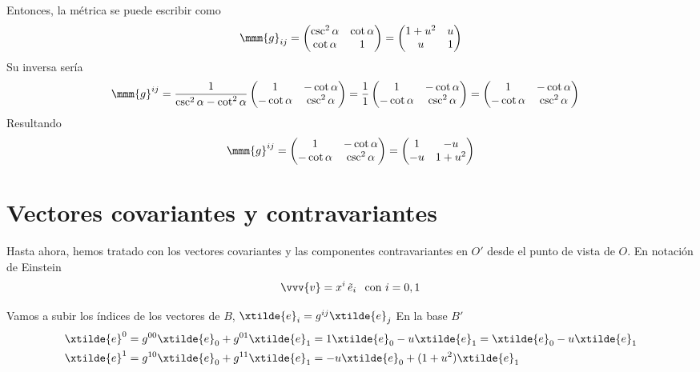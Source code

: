 Entonces, la métrica se puede escribir como
\begin{equation}
  \mmm{g}_{ij}
  = \begin{pmatrix}
    \csc^2\alpha & \cot\alpha\\
    \cot\alpha & 1      
  \end{pmatrix}
  = \begin{pmatrix}
    1+u^2 & u\\
    u & 1      
  \end{pmatrix}
\end{equation}
Su inversa sería
{\small
  \begin{align*}
    \mmm{g}^{ij}
    &=
      \dfrac{1}{\csc^2\alpha-\cot^2\alpha}
      \begin{pmatrix}
        1 & -\cot\alpha\\
        -\cot\alpha & \csc^2\alpha      
      \end{pmatrix}
      = \dfrac{1}{1}
      \begin{pmatrix}
        1 & -\cot\alpha\\
        -\cot\alpha & \csc^2\alpha
      \end{pmatrix}
      = \begin{pmatrix}
        1 & -\cot\alpha\\
        -\cot\alpha & \csc^2\alpha
      \end{pmatrix}    
  \end{align*}
}
Resultando
\begin{equation}
  \mmm{g}^{ij}
    = \begin{pmatrix}
      1 & -\cot\alpha\\
      -\cot\alpha & \csc^2\alpha
    \end{pmatrix}
    = \begin{pmatrix}
      1 & -u\\
      -u & 1+u^2
    \end{pmatrix}
\end{equation}

\section{Vectores covariantes y contravariantes}
Hasta ahora, hemos tratado con los vectores covariantes y las componentes contravariantes
en $O'$ desde el punto de vista de $O$.
En notación de Einstein
\[
  \vvv{v} = x^i\,\tilde{e}_i
  \hspace{0.75em}\text{con } i = 0, 1
\]

Vamos a subir los índices de los vectores de $B$, $\xtilde{e}_i = g^{ij}\xtilde{e}_j$
En la base $B'$
\begin{align*}
  \xtilde{e}^0
  &=
    g^{00}\xtilde{e}_0 + g^{01}\xtilde{e}_1
    = 1\xtilde{e}_0 - u\xtilde{e}_1
    = \xtilde{e}_0 - u\xtilde{e}_1\\
  \xtilde{e}^1
  &=
    g^{10}\xtilde{e}_0 + g^{11}\xtilde{e}_1
    = -u\xtilde{e}_0 + (1+u^2)\xtilde{e}_1
\end{align*}

